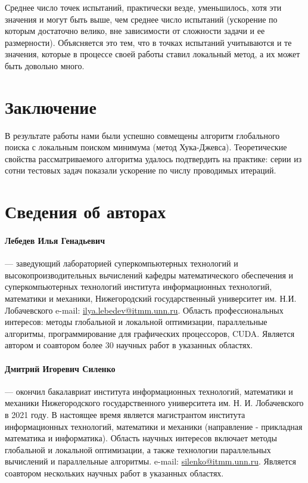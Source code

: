 \documentclass[12pt, a4paper, russian]{article}
\begin{document}
Среднее число точек испытаний, практически везде, уменьшилось, хотя эти значения и могут быть выше, чем среднее число испытаний (ускорение по которым достаточно велико, вне зависимости от сложности задачи и ее размерности). Объясняется это тем, что в точках испытаний учитываются и те значения, которые в процессе своей работы ставил локальный метод, а их может быть довольно много.


\section{Заключение}



В результате работы нами были успешно совмещены алгоритм глобального поиска с локальным поиском минимума (метод Хука-Джевса). Теоретические свойства рассматриваемого алгоритма удалось подтвердить на практике: серии из сотни тестовых задач показали ускорение по числу проводимых итераций.

%
%
\renewcommand{\refname}{Список литературы}


\section*{Сведения об авторах}

\paragraph{Лебедев Илья Генадьевич} --- заведующий лабораторией суперкомпьютерных технологий и высокопроизводительных вычислений кафедры математического обеспечения и суперкомпьютерных технологий института информационных технологий, математики и механики, Нижегородский государственный университет им. Н.И. Лобачевского  e-mail: \url{ilya.lebedev@itmm.unn.ru}. Область профессиональных интересов: методы глобальной и локальной оптимизации, параллельные алгоритмы, программирование для графических процессоров, CUDA. Является автором и соавтором более 30 научных работ в указанных областях.

\paragraph{Дмитрий Игоревич Силенко} --- окончил бакалавриат института информационных технологий, математики и механики Нижегородского государственного университета им. Н. И. Лобачевского в 2021 году. В настоящее время является магистрантом института информационных технологий, математики и механики (направление - прикладная математика и информатика). Область научных интересов включает методы глобальной и локальной оптимизации, а также технологии параллельных вычислений и параллельные алгоритмы. e-mail: \url{silenko@itmm.unn.ru}. Является соавтором нескольких научных работ в указанных областях.
\end{document}
